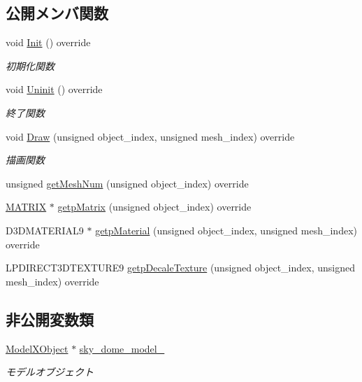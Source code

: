 \subsection*{公開メンバ関数}
\begin{DoxyCompactItemize}
\item 
void \mbox{\hyperlink{class_sky_dome_draw_a5b82e8b650a20dbc0b7ed720d1fb7fab}{Init}} () override
\begin{DoxyCompactList}\small\item\em 初期化関数 \end{DoxyCompactList}\item 
void \mbox{\hyperlink{class_sky_dome_draw_aee1c6b102a97033073b2559b8c2c328b}{Uninit}} () override
\begin{DoxyCompactList}\small\item\em 終了関数 \end{DoxyCompactList}\item 
void \mbox{\hyperlink{class_sky_dome_draw_a42364ea42618cbab588d55050edfe95a}{Draw}} (unsigned object\+\_\+index, unsigned mesh\+\_\+index) override
\begin{DoxyCompactList}\small\item\em 描画関数 \end{DoxyCompactList}\item 
unsigned \mbox{\hyperlink{class_sky_dome_draw_a6b281bafa71c058ee83c373ad978e3bb}{get\+Mesh\+Num}} (unsigned object\+\_\+index) override
\item 
\mbox{\hyperlink{_vector3_d_8h_a032295cd9fb1b711757c90667278e744}{M\+A\+T\+R\+IX}} $\ast$ \mbox{\hyperlink{class_sky_dome_draw_accbc05d1bbde9ad9d6b7180d91e9ed89}{getp\+Matrix}} (unsigned object\+\_\+index) override
\item 
D3\+D\+M\+A\+T\+E\+R\+I\+A\+L9 $\ast$ \mbox{\hyperlink{class_sky_dome_draw_a45d3e8d70753af83c84c7a7c9193459f}{getp\+Material}} (unsigned object\+\_\+index, unsigned mesh\+\_\+index) override
\item 
L\+P\+D\+I\+R\+E\+C\+T3\+D\+T\+E\+X\+T\+U\+R\+E9 \mbox{\hyperlink{class_sky_dome_draw_a99ec8e0a5aea708b66cf07c79a6449d1}{getp\+Decale\+Texture}} (unsigned object\+\_\+index, unsigned mesh\+\_\+index) override
\end{DoxyCompactItemize}
\subsection*{非公開変数類}
\begin{DoxyCompactItemize}
\item 
\mbox{\hyperlink{class_model_x_object}{Model\+X\+Object}} $\ast$ \mbox{\hyperlink{class_sky_dome_draw_a2453fb04f979443c61acc10eafa183aa}{sky\+\_\+dome\+\_\+model\+\_\+}}
\begin{DoxyCompactList}\small\item\em モデルオブジェクト \end{DoxyCompactList}\end{DoxyCompactItemize}
